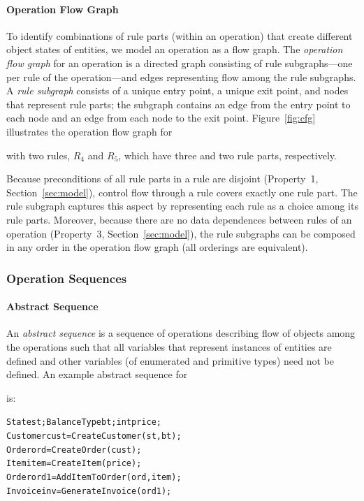 \paragraph*{Operation Flow Graph} To identify combinations of rule parts (within
an operation) that create different object states of entities, we model an
operation as a flow graph. The \textit{operation flow graph} for an operation is
a directed graph consisting of rule subgraphs---one per rule of the
operation---and edges representing flow among the rule subgraphs. A \textit{rule
  subgraph} consists of a unique entry point, a unique exit point, and nodes
that represent rule parts; the subgraph contains an edge from the entry point to
each node and an edge from each node to the exit point.  Figure~\ref{fig:cfg}
illustrates the operation flow graph for \subject{GenerateInvoice} with two
rules, $R_4$ and $R_5$, which have three and two rule parts, respectively.

Because preconditions of all rule parts in a rule are disjoint (Property~1,
Section~\ref{sec:model}), control flow through a rule covers exactly one rule
part.  The rule subgraph captures this aspect by representing each rule as a
choice among its rule parts. Moreover, because there are no data dependences
between rules of an operation (Property~3, Section~\ref{sec:model}), the rule
subgraphs can be composed in any order in the operation flow graph (\ie all
orderings are equivalent).

\subsubsection{Operation Sequences}

\paragraph*{Abstract Sequence} An \textit{abstract sequence} is a sequence of
operations describing flow of objects among the operations such that all
variables that represent instances of entities are defined and other variables
(of enumerated and primitive types) need not be defined. An example abstract
sequence for \subject{GenerateInvoice} is:

\vspace*{-4pt}
{\scriptsize
\begin{alltt} 
 State st; BalanceType bt; int price;
 Customer cust = CreateCustomer(st, bt);
 Order ord = CreateOrder(cust);	 
 Item item = CreateItem(price);
 Order ord1 = AddItemToOrder(ord, item);
 Invoice inv = GenerateInvoice(ord1);  
\end{alltt}
}
\vspace*{-4pt}

